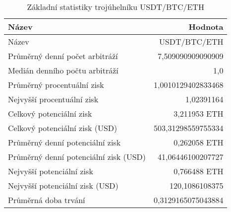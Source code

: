 \begin{table}\centering
\caption{Základní statistiky trojúhelníku USDT/BTC/ETH}
\label{USDTBTCETH_stats}
\begin{tabular}{|| l | r ||}
\hline Název & Hodnota \\ 
\hline\hline Název & USDT/BTC/ETH \\ 
\hline Průměrný denní počet arbitráží & 7,509090909090909 \\ 
\hline Medián denního počtu arbitráží & 1,0 \\ 
\hline Průměrný procentuální zisk & 1,0010129402833468 \\ 
\hline Nejvyšší procentuální zisk & 1,02391164 \\ 
\hline Celkový potenciální zisk & 3,211953 ETH \\ 
\hline Celkový potenciální zisk (USD) & 503,31298559755334 \\ 
\hline Průměrný denní potenciální zisk & 0,262058 ETH \\ 
\hline Průměrný denní potenciální zisk (USD) & 41,06446100207727 \\ 
\hline Nejvyšší potenciální zisk & 0,766488 ETH \\ 
\hline Nejvyšší potenciální zisk (USD) & 120,1086108375 \\ 
\hline Průměrná doba trvání & 0,3129165075043884 \\ 
\hline
\end{tabular}
\end{table}